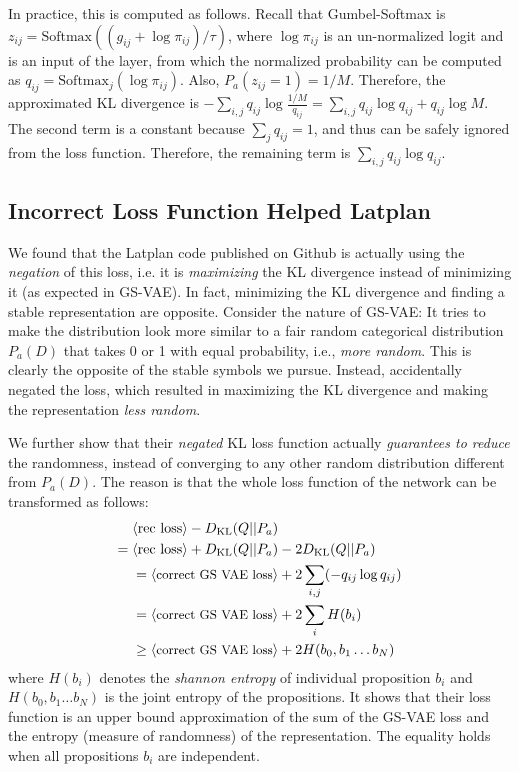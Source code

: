 In practice, this is computed as follows.
Recall that Gumbel-Softmax is $z_{ij} = \text{Softmax}((g_{ij}+\log \pi_{ij})/\tau)$,
where $\log \pi_{ij}$ is an un-normalized logit and is an input of the layer,
from which the normalized probability can be computed as $q_{ij}=\text{Softmax}_j(\log \pi_{ij})$.
Also, $P_a(z_{ij}=1)= 1/M$.
% 
Therefore, the approximated KL divergence is
$-\sum_{i,j} q_{ij} \log \frac{1/M}{q_{ij}} = \sum_{i,j} q_{ij} \log q_{ij} + q_{ij} \log M$.
The second term is a constant because $\sum_j q_{ij} = 1$,
and thus can be safely ignored from the loss function.
Therefore, the remaining term is $\sum_{i,j} q_{ij} \log q_{ij}$.

\subsection{Incorrect Loss Function Helped Latplan}

We found that the Latplan code published on Github is actually using the \emph{negation} of this loss,
i.e. it is \emph{maximizing} the KL divergence instead of minimizing it (as expected in GS-VAE).
In fact, minimizing the KL divergence and finding a stable representation are opposite.
Consider the nature of GS-VAE:
It tries to make the distribution look more similar to a fair random categorical distribution $P_a(D)$
that takes 0 or 1 with equal probability, i.e., \emph{more random}.
This is clearly the opposite of the stable symbols we pursue.
Instead, \citeauthor{Asai2018} accidentally negated the loss, which resulted in
maximizing the KL divergence and making the representation \emph{less random}.

We further show that their \emph{negated} KL loss function
actually \emph{guarantees to reduce} the randomness,
instead of converging to any other random distribution different from $P_a(D)$.
The reason is that the whole loss function of the network can be transformed as follows:
\begin{align*} 
 \brackets{\text{rec loss}}-D_{\text{KL}}(Q||P_a)&                                         \\
=\brackets{\text{rec loss}}+D_{\text{KL}}(Q||P_a)&- 2 D_{\text{KL}}(Q||P_a)                \\
=\brackets{\text{\small correct GS VAE loss}}& + 2 \sum_{i,j} (- q_{ij} \log q_{ij})      \\
=\brackets{\text{\small correct GS VAE loss}}& + 2 \sum_{i} H(b_i)                        \\
\geq\brackets{\text{\small correct GS VAE loss}}& + 2 H(b_0,b_1\ldots b_N)
\end{align*}
where $H(b_i)$ denotes the \emph{shannon entropy} of individual proposition $b_i$ and
$H(b_0,b_1\ldots b_N)$ is the joint entropy of the propositions.
It shows that their loss function is an upper bound approximation of
the sum of the GS-VAE loss and the entropy (measure of randomness) of the representation.
The equality holds when all propositions $b_i$ are independent.

